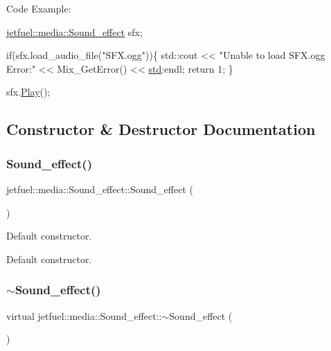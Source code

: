 Code Example\+:


\begin{DoxyCode}
\hyperlink{classjetfuel_1_1media_1_1Sound__effect}{jetfuel::media::Sound\_effect} sfx;

\textcolor{keywordflow}{if}(sfx.load\_audio\_file(\textcolor{stringliteral}{"SFX.ogg"}))\{
    std::cout << \textcolor{stringliteral}{"Unable to load SFX.ogg Error:"} << Mix\_GetError() 
    << \hyperlink{namespacestd}{std}:endl;
    \textcolor{keywordflow}{return} 1;
 \}

sfx.\hyperlink{classjetfuel_1_1media_1_1Sound__effect_a206d3653259cc854fd80fa44a9d333c4}{Play}();
\end{DoxyCode}
 

\subsection{Constructor \& Destructor Documentation}
\mbox{\label{classjetfuel_1_1media_1_1Sound__effect_a56c5c69d077a4cac1a062b391a9860fc}} 
\subsubsection{\texorpdfstring{Sound\+\_\+effect()}{Sound\_effect()}}
{\footnotesize\ttfamily jetfuel\+::media\+::\+Sound\+\_\+effect\+::\+Sound\+\_\+effect (\begin{DoxyParamCaption}{ }\end{DoxyParamCaption})}



Default constructor. 

Default constructor. \mbox{\label{classjetfuel_1_1media_1_1Sound__effect_a105547b1d854a256e90a08fcd6098bdf}} 
\subsubsection{\texorpdfstring{$\sim$\+Sound\+\_\+effect()}{~Sound\_effect()}}
{\footnotesize\ttfamily virtual jetfuel\+::media\+::\+Sound\+\_\+effect\+::$\sim$\+Sound\+\_\+effect (\begin{DoxyParamCaption}{ }\end{DoxyParamCaption})\hspace{0.3cm}{\ttfamily [virtual]}}




